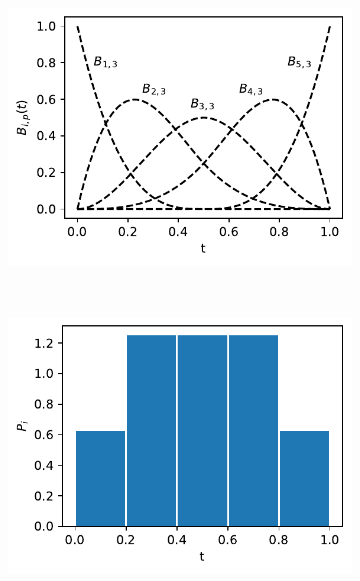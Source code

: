 \documentclass[../Thesis.tex]{subfiles}
\begin{document}
\begin{figure}[h]
    \centering
    \begin{subfigure}[t]{0.49\textwidth}
        \centering
        \includegraphics[width=\linewidth]{figures/MI estimation/B-spline basis functions - degree 3.pdf}
        \caption{}
        \label{subfig:B-spline fuctions}
    \end{subfigure}%
    ~
    \begin{subfigure}[t]{0.49\textwidth}
        \centering
        \includegraphics[width=\linewidth]{figures/MI estimation/B-spline marginal dist - degree 3.pdf}
        \caption{}
        \label{subfig:B-spline marginals}
    \end{subfigure}
    \caption{}
    \label{fig:B-splines}
\end{figure}
\end{document}
